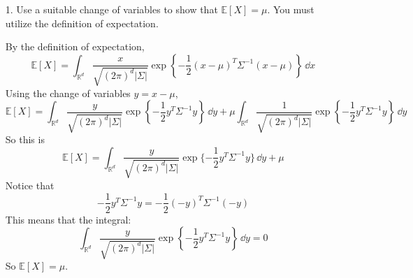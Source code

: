 \documentclass{article}
\begin{document}
        \begin{itemize}
            \item [1.] Use a suitable change of variables to show that $\mathbb{E}[X] = \mu$. You must utilize the definition of expectation.
                \begin{answer}
                    By the definition of expectation,
                        \begin{equation*}
                            \mathbb{E}[X] = \int_{\mathbb{R}^{d}}^{} \dfrac{x}{\sqrt{(2\pi)^{d}\lvert \Sigma \rvert}}\exp\left\{-\dfrac{1}{2}(x - \mu)^{T}\Sigma^{-1}(x - \mu)\right\} \, \dd{x} 
                        \end{equation*}
                    Using the change of variables $y = x - \mu$,
                        \begin{equation*}
                            \mathbb{E}[X] = \int_{\mathbb{R}^{d}}^{} \dfrac{y}{\sqrt{(2\pi)^{d} \lvert \Sigma \rvert}}\exp\left\{-\dfrac{1}{2}y^{T}\Sigma^{-1} y\right\} \, \dd{y} + \mu\int_{\mathbb{R}^{d}}^{} \dfrac{1}{\sqrt{(2\pi)^{d} \lvert \Sigma \rvert}} \exp\left\{-\dfrac{1}{2}y^{T}\Sigma^{-1}y\right\} \, \dd{y} 
                        \end{equation*}
                    So this is
                        \begin{equation*}
                            \mathbb{E}[X] = \int_{\mathbb{R}^{d}}^{} \dfrac{y}{\sqrt{(2\pi)^{d} \lvert \Sigma \rvert}} \exp\{-\dfrac{1}{2}y^{T}\Sigma^{-1}y\} \, \dd{y} + \mu
                        \end{equation*}
                    Notice that
                        \begin{equation*}
                            -\dfrac{1}{2} y^{T} \Sigma^{-1}y = -\dfrac{1}{2} (-y)^{T} \Sigma^{-1}(-y)
                        \end{equation*}
                    This means that the integral:
                        \begin{equation*}
                            \int_{\mathbb{R}^{d}}^{} \dfrac{y}{\sqrt{(2\pi)^{d}\lvert \Sigma \rvert}} \exp\left\{-\dfrac{1}{2} y^{T} \Sigma^{-1}y\right\} \, \dd{y}  = 0
                        \end{equation*}
                    So $\mathbb{E}[X] = \mu$.
                \end{answer}


\end{itemize}
\end{document}
